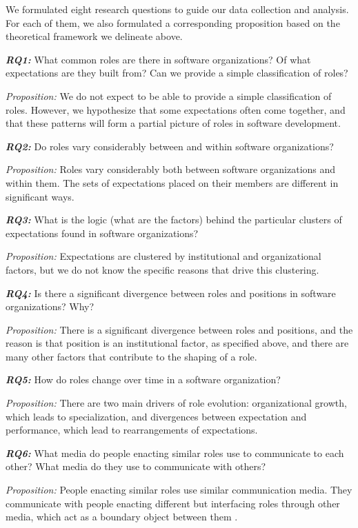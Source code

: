 \documentclass[10pt, conference, compsocconf]{IEEEtran}
\begin{document}
We formulated eight research questions to guide our data collection and analysis. For each of them, we also formulated a corresponding proposition based on the theoretical framework we delineate above.

\textbf{\emph{RQ1:}} What common roles are there in software organizations? Of what expectations are they built from? Can we provide a simple classification of roles?

\emph{Proposition:} We do not expect to be able to provide a simple classification of roles. However, we hypothesize that some expectations often come together, and that these patterns will form a partial picture of roles in software development.

\textbf{\emph{RQ2:}} Do roles vary considerably between and within software organizations?

\emph{Proposition:} Roles vary considerably both between software organizations and within them. The sets of expectations placed on their members are different in significant ways.

\textbf{\emph{RQ3:}} What is the logic (what are the factors) behind the particular clusters of expectations found in software organizations?

\emph{Proposition:} Expectations are clustered by institutional and organizational factors, but we do not know the specific reasons that drive this clustering.

\textbf{\emph{RQ4:}} Is there a significant divergence between roles and positions in software organizations? Why?

\emph{Proposition:} There is a significant divergence between roles and positions, and the reason is that position is an institutional factor, as specified above, and there are many other factors that contribute to the shaping of a role.

\textbf{\emph{RQ5:}} How do roles change over time in a software organization?

\emph{Proposition:} There are two main drivers of role evolution: organizational growth, which leads to specialization, and divergences between expectation and performance, which lead to rearrangements of expectations.

\textbf{\emph{RQ6:}} What media do people enacting similar roles use to communicate to each other? What media do they use to communicate with others?

\emph{Proposition:} People enacting similar roles use similar communication media. They communicate with people enacting different but interfacing roles through other media, which act as a boundary object between them \cite{Bowker1999}.
\end{document}
